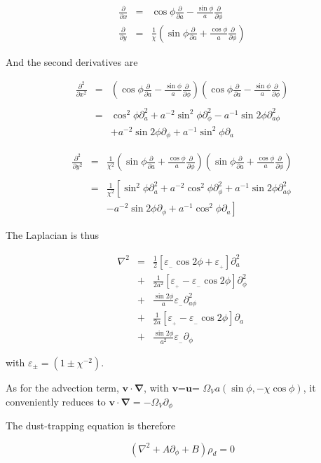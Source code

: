\documentclass[useAMS,8pt,twocolumn]{article}
\newcommand{\pderiv}[2]{\frac{\partial #1}{\partial #2}}
\newcommand{\pderivn}[3]{\frac{\partial^{#3} #1}{\partial #2^{#3}}}
\renewcommand{\v}[1]{{\boldsymbol{#1}}} %
\newcommand{\del}{\v{\nabla}}
\newcommand{\grad}{\del}
\newcommand{\Laplace}{\nabla^2}
\newcommand{\beq}{\begin{equation}}
\newcommand{\eeq}{\end{equation}}
\newcommand{\beqn}{\begin{eqnarray}}
\newcommand{\eeqn}{\end{eqnarray}}
\newcommand{\epsp}{\varepsilon_{_{+}}}
\newcommand{\epsm}{\varepsilon_{_{-}}}
\begin{document}
\beqn
\pderiv{}{x} &=& \cos\phi \pderiv{}{a} - \frac{\sin\phi}{a} \pderiv{}{\phi} \\
\pderiv{}{y} &=& \frac{1}{\chi}\left(\sin\phi \pderiv{}{a} + \frac{\cos\phi}{a} \pderiv{}{\phi} \right)
\eeqn

And the second derivatives are 

\beqn
\pderivn{}{x}{2} &=& \left(\cos\phi \pderiv{}{a} - \frac{\sin\phi}{a}
  \pderiv{}{\phi}\right) \left(\cos\phi \pderiv{}{a} -
  \frac{\sin\phi}{a} \pderiv{}{\phi}\right) \nonumber \\ \\
&=& \cos^2\phi\partial^2_a + a^{-2}\sin^2\phi \partial^2_\phi -
a^{-1}\sin 2\phi \partial^2_{a\phi} \nonumber \\
&&+ a^{-2}\sin 2\phi\partial_\phi +
a^{-1}\sin^2\phi \partial_a 
\eeqn

\beqn
\pderivn{}{y}{2} &=& \frac{1}{\chi^2}\left(\sin\phi \pderiv{}{a} +
  \frac{\cos\phi}{a} \pderiv{}{\phi} \right) \left(\sin\phi
  \pderiv{}{a} + \frac{\cos\phi}{a} \pderiv{}{\phi} \right) \nonumber
\\ \\
&=& \frac{1}{\chi^2}\left[ \sin^2\phi \partial^2_a +
  a^{-2}\cos^2\phi \partial^2_\phi + a^{-1}\sin
  2\phi \partial^2_{a\phi}\right. \nonumber \\
&&\left.- a^{-2}\sin 2\phi \partial_\phi +
  a^{-1}\cos^2\phi \partial_a \right] 
\eeqn

The Laplacian is thus 

\beqn
\Laplace{} &= &\frac{1}{2}\left[ \epsm \cos 2\phi + \epsp\right] \partial^2_a  \\
                &+& \frac{1}{2a^2}\left[ \epsp - \epsm \cos 2\phi\right] \partial^2_\phi  \\
                &+& \frac{\sin 2\phi}{a}\epsm \partial^2_{a\phi}  \\
                &+& \frac{1}{2a}\left[ \epsp - \epsm \cos 2\phi\right] \partial_a  \\
                &+& \frac{\sin 2\phi}{a^2} \epsm\partial_\phi
\eeqn

with $\varepsilon_{\pm} = (1 \pm \chi^{-2})$. 

As for the advection term, $\v{v}\cdot\grad$, with $\v{v}$=$\v{u}$=
$\varOmega_V a(\sin\phi,-\chi\cos\phi)$, it conveniently reduces to  $\v{v}\cdot\grad=  -\varOmega_V \partial_\phi $

The dust-trapping equation is therefore 

\beq
\left(\Laplace{} + A\partial_\phi + B\right) \rho_d = 0 
\eeq
\end{document}
